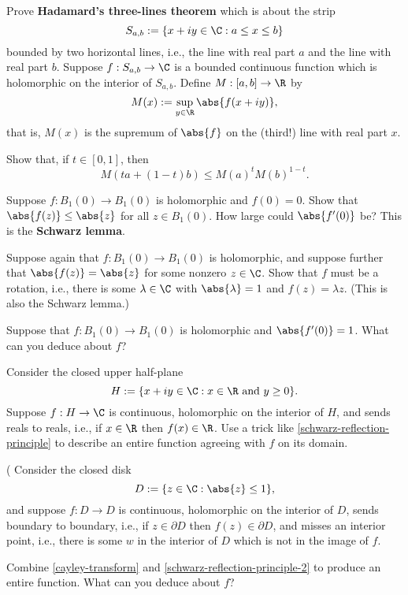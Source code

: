 \documentclass{homework}
\begin{document}
\begin{problem}\label{hadamard-three-lines}Prove \textbf{Hadamard's
    three-lines theorem} which is about the strip
  \[
    S_{a,b} := \{ x+iy \in \C : a \leq x \leq b\}
  \]
  bounded by two horizontal lines, i.e., the line with real part $a$
  and the line with real part $b$.  Suppose $f : S_{a,b} \to \C$ is a
  bounded continuous function which is holomorphic on the interior of
  $S_{a,b}$.  Define $M : [a,b] \to \R$ by
  \[
    M(x) := \sup_{y \in \R} \abs{f(x+iy)},
  \]
  that is, $M(x)$ is the supremum of $\abs{f}$ on the (third!) line with real part $x$.
  
  Show that, if $t \in [0,1]$, then \[
    M\left( ta + (1-t)b \right) \leq M(a)^t M(b)^{1-t}.
  \]
\end{problem}

\begin{problem}\label{schwarz-lemma}Suppose $f : B_1(0) \to B_1(0)$ is holomorphic and $f(0) = 0$.  Show
  that $\abs{f(z)} \leq \abs{z}$ for all $z \in B_1(0)$.  How large
  could $\abs{f'(0)}$ be?  This is the \textbf{Schwarz lemma}.
\end{problem}

\begin{problem}\label{schwarz-lemma-2}Suppose again that $f : B_1(0) \to B_1(0)$ is holomorphic, and
  suppose further that $\abs{f(z)} = \abs{z}$ for some nonzero
  $z \in \C$.  Show that $f$ must be a rotation, i.e., there is some
  $\lambda \in \C$ with $\abs{\lambda} = 1$ and $f(z) = \lambda z$.
  (This is also the Schwarz lemma.)
\end{problem}

\begin{problem}\label{schwarz-lemma-3}Suppose that
  $f : B_1(0) \to B_1(0)$ is holomorphic and $\abs{f'(0)} = 1$.  What
  can you deduce about $f$?
\end{problem}

\begin{problem}\label{schwarz-reflection-principle-2}Consider the
  closed upper half-plane
  \[
    H := \{ x + iy \in \C : x \in \R \mbox{ and } y \geq 0 \}.
  \]
  Suppose $f : H \to \C$ is continuous, holomorphic on the interior of
  $H$, and sends reals to reals, i.e., if $x \in \R$ then
  $f(x) \in \R$.  Use a trick like \ref{schwarz-reflection-principle}
  to describe an entire function agreeing with $f$ on its domain.
\end{problem}

\begin{problem}(
  Consider the closed disk
  \[
    D := \{ z \in \C : \abs{z} \leq 1 \},
  \]
  and suppose $f : D \to D$ is continuous, holomorphic on the interior
  of $D$, sends boundary to boundary, i.e., if $z \in \partial D$ then
  $f(z) \in \partial D$, and misses an interior point, i.e., there is
  some $w$ in the interior of $D$ which is not in the image of $f$.

  Combine \ref{cayley-transform} and
  \ref{schwarz-reflection-principle-2} to produce an entire function.
  What can you deduce about $f$?
\end{problem}
\end{document}
